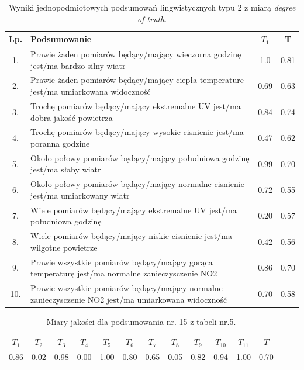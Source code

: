\documentclass{article}
\begin{document}
\begin{table}[H]
\begin{center}
\normalsize %
\begin{tabular}{|c|p{8cm}|c|c|} %
\hline
\textbf{Lp.} & \textbf{Podsumowanie} & \textbf{\(T_1\)} & \textbf{T} \\ \hline
1. & Prawie żaden pomiarów będący/mający wieczorna godzinę jest/ma bardzo silny wiatr & 1.0 & 0.81\\\hline
2. & Prawie żaden pomiarów będący/mający ciepła temperature jest/ma umiarkowana widoczność & 0.69 & 0.63 \\ \hline
3. & Trochę pomiarów będący/mający ekstremalne UV jest/ma dobra jakość powietrza & 0.84 & 0.74 \\ \hline
4. & Trochę pomiarów będący/mający wysokie cisnienie jest/ma poranna godzine & 0.47 & 0.62 \\ \hline
5. & Około połowy pomiarów będący/mający południowa godzinę jest/ma słaby wiatr & 0.99 & 0.70 \\ \hline
6. & Około połowy pomiarów będący/mający normalne cisnienie jest/ma umiarkowany wiatr & 0.72 & 0.55 \\\hline
7. & Wiele pomiarów będący/mający ekstremalne UV jest/ma południowa godzinę & 0.20 & 0.57 \\ \hline
8. & Wiele pomiarów będący/mający niskie cisnienie jest/ma wilgotne powietrze & 0.42 & 0.56 \\ \hline
9. & Prawie wszystkie pomiarów będący/mający gorąca temperaturę jest/ma normalne zanieczysczenie NO2 & 0.86 & 0.70 \\ \hline
10. & Prawie wszystkie pomiarów będący/mający normalne zanieczysczenie NO2 jest/ma umiarkowana widoczność & 0.70 & 0.58 \\ \hline

\end{tabular}
\caption{Wyniki jednopodmiotowych podsumowań lingwistycznych typu 2 z miarą \textit{degree of truth}.}
\end{center}
\end{table}


\begin{table}[H]
    \centering
    \begin{tabular}{|c|c|c|c|c|c|c|c|c|c|c|c|}
    \hline
    \textbf{\(T_1\)} &\textbf{\(T_2\)} & \textbf{\(T_3\)} & \textbf{\(T_4\)} & \textbf{\(T_5\)} & \textbf{\(T_6\)} & \textbf{\(T_7\)} & \textbf{\(T_8\)} & \textbf{\(T_9\)} & \textbf{\(T_{10}\)} & \textbf{\(T_{11}\)} & \textbf{\(T\)} \\ \hline
    0.86 & 0.02 & 0.98 & 0.00 & 1.00 & 0.80 & 0.65 & 0.05 & 0.82 & 0.94 & 1.00 & 0.70 \\ \hline
    \end{tabular}
    \caption{Miary jakości dla podsumowania nr. 15 z tabeli nr.5.}
\end{table}  
\end{document}
